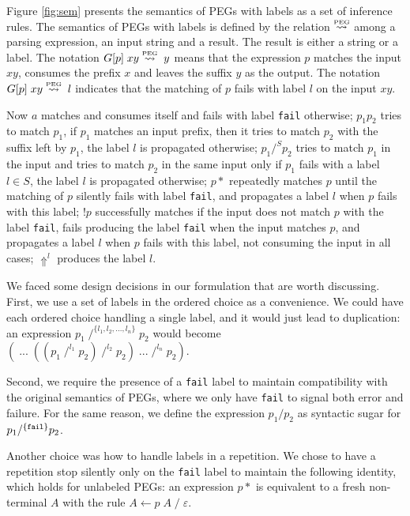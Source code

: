 \documentclass[3p,12pt,singlecolumn]{elsarticle}
\newcommand{\Lp}{\stackrel{\mbox{\tiny{PEG}}}{\leadsto}}
\newcommand{\throw}{\Uparrow}
\begin{document}
Figure \ref{fig:sem} presents the semantics of PEGs with labels
as a set of inference rules.
The semantics of PEGs with labels is defined by the relation
$\Lp$ among a parsing expression, an input string and a result.
The result is either a string or a label.
The notation $G[p] \; xy \Lp \; y$ means that the expression
$p$ matches the input $xy$, consumes the prefix $x$ and leaves the
suffix $y$ as the output.
The notation $G[p] \; xy \Lp \; l$ indicates that the
matching of $p$ fails with label $l$ on the input $xy$.

Now $a$ matches and consumes itself and fails with label \texttt{fail}
otherwise;
$p_1 p_2$ tries to match $p_1$, if $p_1$ matches an input prefix,
then it tries to match $p_2$ with the suffix left by $p_1$,
the label $l$ is propagated otherwise;
$p_1 /^{S} p_2$ tries to match $p_1$ in the input and tries to
match $p_2$ in the same input only if $p_1$ fails with a label
$l \in S$, the label $l$ is propagated otherwise;
$p*$ repeatedly matches $p$ until the matching of $p$
silently fails with label {\tt fail}, and propagates a label $l$
when $p$ fails with this label;
$!p$ successfully matches if the input does not match $p$ with
the label {\tt fail}, fails producing the label \texttt{fail} when
the input matches $p$, and propagates a label $l$ when $p$
fails with this label, not consuming the input in all cases;
$\throw^{l}$ produces the label $l$.

We faced some design decisions in our formulation that are worth
discussing. First, we use a set of labels in the ordered choice as
a convenience. We could have each ordered choice handling a single label,
and it would just lead to duplication:
an expression
$p_1 \; /^{\{l_1,l_2,...,l_n\}} \; p_2$
would become
$( \; ... \; ((p_1 \; /^{l_1} \; p_2) \; /^{l_2} \; p_2) \; ... \; /^{l_n} \; p_2)$.

Second, we require the presence of a \texttt{fail} label
to maintain compatibility with the original semantics of PEGs,
where we only have \texttt{fail} to signal both error and failure.
For the same reason, we define the expression $p_1 / p_2$ as
syntactic sugar for $p_1 /^{\{{\tt fail}\}} p_2$.

Another choice was how to handle labels in a repetition.
We chose to have a repetition stop silently only on the
\texttt{fail}
label to maintain the following identity, which holds
for unlabeled PEGs: an expression $p*$
is equivalent to a fresh non-terminal $A$ with the rule
$A \leftarrow p \; A \; / \; \varepsilon$.
\end{document}
